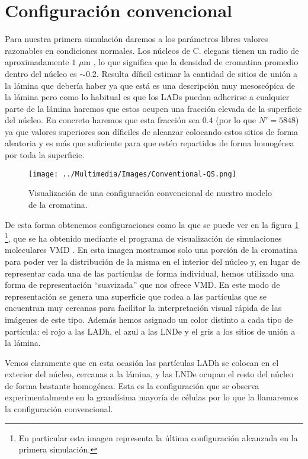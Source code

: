 \section{Configuración convencional}

Para nuestra primera simulación daremos a los parámetros libres valores razonables en condiciones normales. Los núcleos de C. elegans tienen un radio de aproximadamente $1$ $\mu$m \cite{Ikegami2010}, lo que significa que la densidad de cromatina promedio dentro del núcleo es $\sim 0.2$. Resulta díficil estimar la cantidad de sitios de unión a la lámina que debería haber ya que está es una descripción muy mesoscópica de la lámina pero como lo habitual es que los LADs puedan adherirse a cualquier parte de la lámina haremos que estos ocupen una fracción elevada de la superficie del núcleo. En concreto haremos que esta fracción sea $0.4$ (por lo que $N'=5848$) ya que valores superiores son díficiles de alcanzar colocando estos sitios de forma aleatoria y es más que suficiente para que estén repartidos de forma homogénea por toda la superficie.

\begin{figure}
    \centering
    \texttt{[image: ../Multimedia/Images/Conventional-QS.png]}
    \caption{Visualización de una configuración convencional de nuestro modelo de la cromatina.}
    \label{fig:vmd_QS_image_c}
\end{figure}

De esta forma obtenemos configuraciones como la que se puede ver en la figura \ref{fig:vmd_QS_image_c} \footnote{En particular esta imagen representa la última configuración alcanzada en la primera simulación.}, que se ha obtenido mediante el programa de visualización de simulaciones moleculares VMD \cite{Humphrey96}. En esta imagen mostramos solo una porción de la cromatina para poder ver la distribución de la misma en el interior del núcleo y, en lugar de representar cada una de las partículas de forma individual, hemos utilizado una forma de representación ``suavizada'' que nos ofrece VMD. En este modo de representación se genera una superficie que rodea a las partículas que se encuentran muy cercanas para facilitar la interpretación visual rápida de las imágenes de este tipo. Además hemos asignado un color distinto a cada tipo de partícula: el rojo a las LADh, el azul a las LNDe y el gris a los sitios de unión a la lámina.

Vemos claramente que en esta ocasión las partículas LADh se colocan en el exterior del núcleo, cercanas a la lámina, y las LNDe ocupan el resto del núcleo de forma bastante homogénea. Esta es la configuración que se observa experimentalmente en la grandísima mayoría de células \cite{Camara2023} por lo que la llamaremos la configuración convencional.

